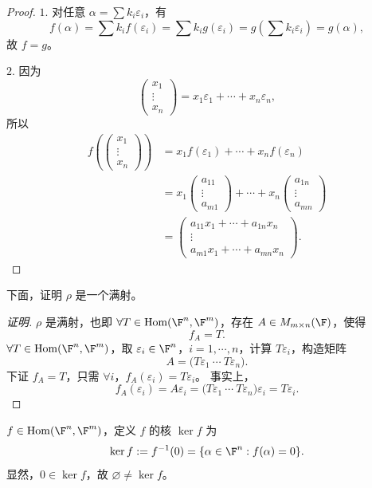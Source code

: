 \begin{proof}
	$1.$ 对任意 $\alpha=\sum k_i\varepsilon_i$，有
	\[
	f(\alpha)=\sum k_i f(\varepsilon_i)
	=\sum k_i g(\varepsilon_i)
	=g\left(\sum k_i\varepsilon_i\right)=g(\alpha),
	\]
	故 $f=g$。
	
	$2.$ 因为
	\[
	\begin{pmatrix}x_1\\\vdots\\x_n\end{pmatrix}
	=x_1\varepsilon_1+\cdots+x_n\varepsilon_n,
	\]
	所以
	\[
	\begin{aligned}
		f\left(\begin{pmatrix}x_1\\\vdots\\x_n\end{pmatrix}\right)
		&=x_1f(\varepsilon_1)+\cdots+x_nf(\varepsilon_n)\\
		&=x_1\begin{pmatrix}a_{11}\\\vdots\\a_{m1}\end{pmatrix}
		+\cdots+
		x_n\begin{pmatrix}a_{1n}\\\vdots\\a_{mn}\end{pmatrix}\\
		&=\begin{pmatrix}
			a_{11}x_1+\cdots+a_{1n}x_n\\
			\vdots\\
			a_{m1}x_1+\cdots+a_{mn}x_n
		\end{pmatrix}.
	\end{aligned}
	\]
\end{proof}

下面，证明 $\rho$ 是一个满射。
\begin{proof}[证明]
	$\rho$ 是满射，也即 $\forall T\in\operatorname{Hom}(\F^n,\F^m)$，存在 $A\in M_{m\times n}(\F)$，使得
	\[
	f_A=T.
	\]
	$\forall T\in\operatorname{Hom}(\F^n,\F^m)$，取 $\varepsilon_i\in\F^n$，$i=1,\cdots,n$，计算 $T\varepsilon_i$，构造矩阵
	\[
	A=\bigl(T\varepsilon_1\ \cdots\ T\varepsilon_n\bigr).
	\]
	下证 $f_A=T$，只需 $\forall i$，$f_A(\varepsilon_i)=T\varepsilon_i$。
	事实上，
	\[
	f_A(\varepsilon_i)=A\varepsilon_i
	=\bigl(T\varepsilon_1\ \cdots\ T\varepsilon_n\bigr)\varepsilon_i
	=T\varepsilon_i.
	\]
\end{proof}

\begin{definition}
	$f\in\operatorname{Hom}(\F^n,\F^m)$，定义 $f$ 的核 $\ker f$ 为
	\[
	\ker f:=f^{-1}(0)=\{\alpha\in\F^n:f(\alpha)=0\}.
	\]
	显然，$0\in\ker f$，故 $\varnothing\neq\ker f$。
\end{definition}

